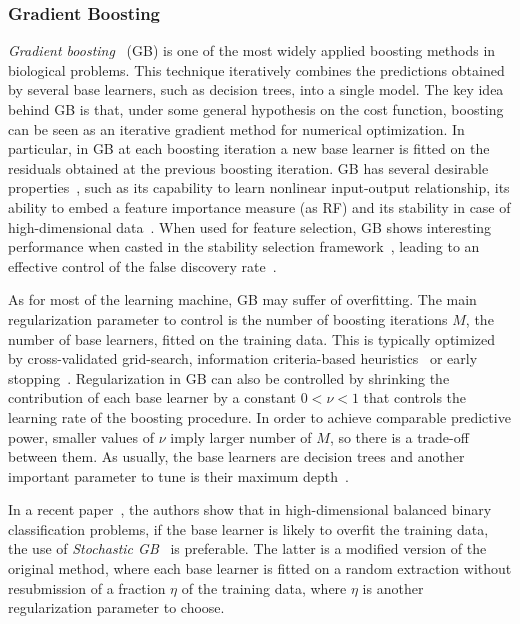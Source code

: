 	    \subsubsection{Gradient Boosting} \label{sec:gradient_boosting}
	    
	    \textit{Gradient boosting}~\cite{friedman2001greedy} (\ac{GB}) is one of the most widely applied boosting methods in biological problems.
	    This technique iteratively combines the predictions obtained by several base learners, such as decision trees, into a single model.
	    The key idea behind GB is that, under some general hypothesis on the cost function, boosting can be seen as an iterative gradient method for numerical optimization.
	    In particular, in GB at each boosting iteration a new base learner is fitted on the residuals obtained at the previous boosting iteration.
	    GB has several desirable properties~\cite{mayr2014evolution}, such as its capability to learn nonlinear input-output relationship, its ability to embed a feature importance measure (as RF) and its stability in case of high-dimensional data~\cite{buehlmann2006boosting}. When used for feature selection, GB shows interesting performance when casted in the stability selection framework~\cite{meinshausen2010stability}, leading to an effective control of the false discovery rate~\cite{everitt2006cambridge}.

	    As for most of the learning machine, GB may suffer of overfitting. The main regularization parameter to control is the number of boosting iterations $M$, \ie the number of base learners, fitted on the training data. This is typically optimized by cross-validated grid-search, information criteria-based heuristics~\cite{tutz2006generalized, tutz2007boosting} or early stopping~\cite{prechelt1998early}.
	    Regularization in GB can also be controlled by shrinking the contribution of each base learner by a constant $0<\nu<1$ that controls the learning rate of the boosting procedure. In order to achieve comparable predictive power, smaller values of $\nu$ imply larger number of $M$, so there is a trade-off between them.
	    As usually, the base learners are decision trees and another important parameter to tune is their maximum depth~\cite{hastie2009elements}.

	    In a recent paper~\cite{lusa2015boosting}, the authors show that in high-dimensional balanced binary classification problems, if the base learner is likely to overfit the training data, the use of \textit{Stochastic GB}~\cite{friedman2002stochastic} is preferable. The latter is a modified version of the original method, where each base learner is fitted on a random extraction without resubmission of a fraction $\eta$ of the training data, where $\eta$ is another regularization parameter to choose.
	    
